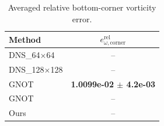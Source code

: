 \begin{table}[t]
\centering
\caption{Averaged relative bottom-corner vorticity error.}
\label{tab:corner_vorticity_relative_l2}
\begin{tabular}{lc}
\toprule
Method & $e^{\mathrm{rel}}_{\omega,\mathrm{corner}}$ \\
\midrule
DNS\_64$\times$64 & -- \\
DNS\_128$\times$128 & -- \\
GNOT & \textbf{1.0099e-02 $\pm$ 4.2e-03} \\
GNOT & -- \\
Ours & -- \\
\bottomrule
\end{tabular}
\end{table}